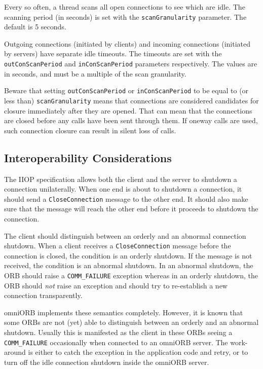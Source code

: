 \documentclass[11pt,oneside,a4paper]{book}
\newcommand{\code}[1]{\texttt{#1}}
\newcommand{\dsc}{\discretionary{}{}{}}
\begin{document}
Every so often, a thread scans all open connections to see which are
idle. The scanning period (in seconds) is set with the
\code{scanGranularity} parameter. The default is 5 seconds.

Outgoing connections (initiated by clients) and incoming connections
(initiated by servers) have separate idle timeouts.  The timeouts are
set with the \code{outConScan\dsc{}Period} and \code{inConScanPeriod}
parameters respectively. The values are in seconds, and must be a
multiple of the scan granularity.

Beware that setting \code{outConScanPeriod} or \code{inConScanPeriod}
to be equal to (or less than) \code{scanGranularity} means that
connections are considered candidates for closure immediately after
they are opened. That can mean that the connections are closed before
any calls have been sent through them. If oneway calls are used, such
connection closure can result in silent loss of calls.


\subsection{Interoperability Considerations}

The IIOP specification allows both the client and the server to
shutdown a connection unilaterally. When one end is about to shutdown
a connection, it should send a \code{CloseConnection} message to the
other end. It should also make sure that the message will reach the
other end before it proceeds to shutdown the connection.

The client should distinguish between an orderly and an abnormal
connection shutdown. When a client receives a \code{CloseConnection}
message before the connection is closed, the condition is an orderly
shutdown.  If the message is not received, the condition is an
abnormal shutdown.  In an abnormal shutdown, the ORB should raise a
\code{COMM\_FAILURE} exception whereas in an orderly shutdown, the ORB
should \emph{not} raise an exception and should try to re-establish a
new connection transparently.

omniORB implements these semantics completely. However, it is known
that some ORBs are not (yet) able to distinguish between an orderly
and an abnormal shutdown. Usually this is manifested as the client in
these ORBs seeing a \code{COMM\_FAILURE} occasionally when connected
to an omniORB server. The work-around is either to catch the exception
in the application code and retry, or to turn off the idle connection
shutdown inside the omniORB server.
\end{document}
